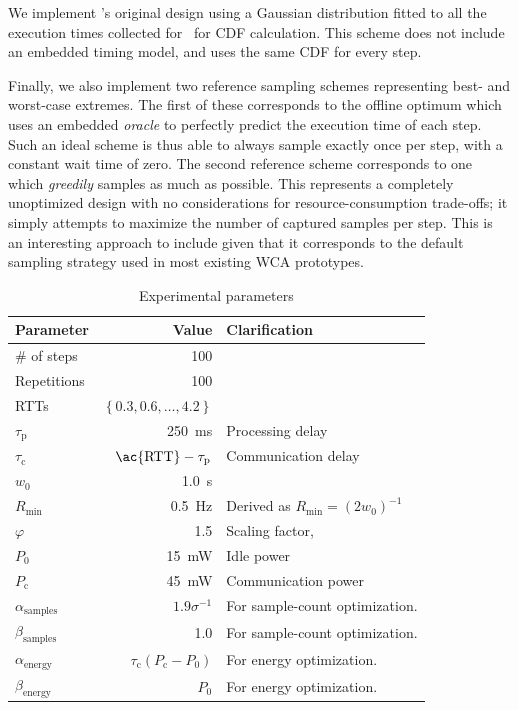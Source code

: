 We implement \citeauthor{Wang2019Towards}'s original design using a Gaussian distribution fitted to all the execution times collected for~\cite{olguinmunoz:impact2021} for \ac{CDF} calculation.
This scheme does not include an embedded timing model, and uses the same \ac{CDF} for every step.

Finally, we also implement two reference sampling schemes representing best- and worst-case extremes.
The first of these corresponds to the offline optimum which uses an embedded \emph{oracle} to perfectly predict the execution time of each step.
Such an ideal scheme is thus able to always sample exactly once per step, with a constant wait time of zero.
The second reference scheme corresponds to one which \emph{greedily} samples as much as possible.
This represents a completely unoptimized design with no considerations for resource-consumption trade-offs; it simply attempts to maximize the number of captured samples per step.
This is an interesting approach to include given that it corresponds to the default sampling strategy used in most existing \ac{WCA} prototypes.

\begin{table}
    \centering
    \caption{Experimental parameters}\label{tab:params}
    \begin{tabular}{lrl}
        \toprule
        Parameter & Value & Clarification \\
        \midrule
        \# of steps & \num{100} & \\
        Repetitions & \num{100} & \\
        \acp{RTT} & \( \left\{ 0.3, 0.6,\ldots,4.2 \right\} \) & \\
        \( \tau_\text{p} \) & \SI{250}{\milli\second} & Processing delay \\
        \( \tau_\text{c} \) & \( \text{\ac{RTT}} - \tau_\text{p} \) & Communication delay \\
        \( w_0 \) & \SI{1.0}{\second} & \\
        \( R_\text{min} \) & \SI{0.5}{\hertz} & Derived as \( R_\text{min} = {(2 w_0)}^{-1} \) \\
        \( \varphi \) & \num{1.5} & Scaling factor, \textcite{Wang2019Towards}\\
        \( P_0 \) & \SI{15}{\milli\watt} & Idle power \\
        \( P_\text{c} \) & \SI{45}{\milli\watt} & Communication power \\
        \( \alpha_\text{samples} \) & \( 1.9 \sigma^{-1} \) & For sample-count optimization. \\
        \( \beta_\text{samples} \) & \num{1.0} & For sample-count optimization. \\
        \( \alpha_\text{energy} \) & \( \tau_\text{c}(P_\text{c} - P_0) \) & For energy optimization. \\
        \( \beta_\text{energy} \) & \( P_0 \) & For energy optimization. \\
        \bottomrule
    \end{tabular}
\end{table}

